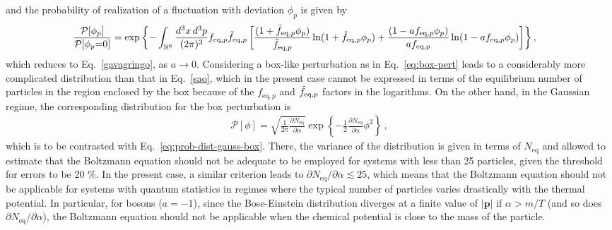 \documentclass[aps,prd,preprint,nofootinbib,amsmath,amssymb,showpacs,longbibliography,singlecolumn,superscriptaddress,10pt]{revtex4-1}
\theoremstyle{plain}
\theoremstyle{definition}
\begin{document}
%
and the probability of realization of a fluctuation with deviation $\phi_{p}$ is given by
%
\begin{equation}
\label{eq:gavagringo-BE-FD}
\begin{aligned}
&
  \dfrac{\mathcal{P}[\phi_p]}{\mathcal{P}[\phi_p{=}0]} = \exp \left\{- \int_{\mathbb{R}^6} \dfrac{d^3 x \, d^3p}{(2\pi)^3} f_{\text{eq},p} \Tilde{f}_{\text{eq},p}\left[ 
\frac{(1 + \Tilde{f}_{\text{eq},p} \phi_{p})}{\Tilde{f}_{\text{eq},p}}
\ln(1 + \Tilde{f}_{\text{eq},p} \phi_{p}) 
+
\frac{(1 - a f_{\text{eq},p} \phi_{p})}{a f_{\text{eq},p}}
\ln(1 - a f_{\text{eq},p} \phi_{p})
\right]
 \right\},
\end{aligned}
\end{equation}
%
which reduces to Eq.~\eqref{gavagringo}, as $a \to 0$. Considering a box-like perturbation as in Eq.~\eqref{eq:box-pert}
leads to a considerably more complicated distribution than that in Eq.~\eqref{sao}, which in the present case cannot be expressed in terms of the equilibrium number of particles in the region enclosed by the box because of the $f_{\text{eq},p}$ and $\Tilde{f}_{\text{eq},p}$  factors in the logarithms. On the other hand, in the Gaussian regime, the corresponding distribution for the box perturbation is 
%
\begin{equation}
\label{eq:gavagringoGauss-FD-BE}    
\begin{aligned}
 \mathcal{P}[\phi] = \sqrt{\frac{1}{2 \pi}\frac{\partial N_{\mathrm{eq}}}{\partial \alpha}} \exp \left\{ - \frac{1}{2} \frac{\partial N_{\mathrm{eq}}}{\partial \alpha}   \phi^2 \right\} \, ,
\end{aligned}
\end{equation}
%
which is to be contrasted with Eq.~\eqref{eq:prob-dist-gauss-box}. There, the variance of the distribution is given in terms of $N_{\mathrm{eq}}$ and allowed to estimate that the Boltzmann equation should not be adequate to be employed for systems with less than 25 particles, given the threshold for errors to be 20 \%. In the present case, a similar criterion leads to $\partial N_{\mathrm{eq}}/\partial \alpha \lesssim  25$, which means that the Boltzmann equation should not be applicable for systems with quantum statistics in regimes where the typical number of particles varies drastically with the thermal potential. In particular, for bosons ($a=-1$), since the Bose-Einstein distribution diverges at a finite value of  $\vert \mathbf{p} \vert$ if $\alpha > m/T$ (and so does $\partial N_{\mathrm{eq}}/\partial \alpha$), the Boltzmann equation should not be applicable when the chemical potential is close to the mass of the particle.
\end{document}
